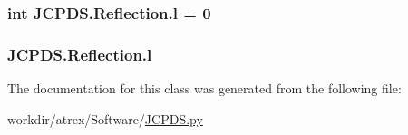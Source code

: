 \hypertarget{class_j_c_p_d_s_1_1_reflection_af56bfe0782709d77e267c57b198c3e0a}{
\subsubsection[{l}]{\setlength{\rightskip}{0pt plus 5cm}int J\-C\-P\-D\-S.\-Reflection.\-l = 0\hspace{0.3cm}{\ttfamily [static]}}}\label{class_j_c_p_d_s_1_1_reflection_af56bfe0782709d77e267c57b198c3e0a}
\hypertarget{class_j_c_p_d_s_1_1_reflection_a678d14a1fe67331931242cc73ef096b9}{
\subsubsection[{l}]{\setlength{\rightskip}{0pt plus 5cm}J\-C\-P\-D\-S.\-Reflection.\-l}}\label{class_j_c_p_d_s_1_1_reflection_a678d14a1fe67331931242cc73ef096b9}


The documentation for this class was generated from the following file\-:\begin{DoxyCompactItemize}
\item 
workdir/atrex/\-Software/\hyperlink{_j_c_p_d_s_8py}{J\-C\-P\-D\-S.\-py}\end{DoxyCompactItemize}
